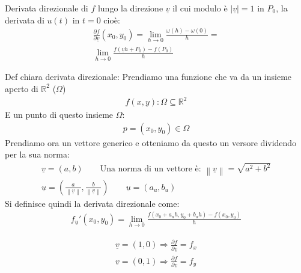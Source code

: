 \documentclass[a4paper, oneside]{article}
\begin{document}
        \begin{definition}
            Derivata direzionale di $f$ lungo la direzione $\underline{v}$ il cui modulo è $| \underline{v} | = 1$ in $P_0$, la derivata di $u(t)$ in $t=0$ cioè:
            \begin{gather*}
                \frac{\partial f}{\partial \underline{v}} (x_0,y_0) = \lim_{h \to 0} \frac{\omega(h) -\omega(0)}{h} = \\
                \lim_{h \to 0} \frac{f(\underline{v} h + P_0) - f(P_0)}{h}
            \end{gather*}
        \end{definition}
        \begin{definition}
            Def chiara derivata direzionale:
            Prendiamo una funzione che va da un insieme aperto di $\mathbb{R}^2$ ($\Omega$) 
            \begin{gather*}
                f(x,y):\Omega \subseteq \mathbb{R}^2
            \end{gather*}
            E un punto di questo insieme $\Omega$:
            \begin{gather*}
                p = (x_0,y_0) \in \Omega
            \end{gather*}
            Prendiamo ora un vettore generico e otteniamo da questo un versore dividendo per la sua norma:
            \begin{gather*}
                \underline{v}=(a,b) \qquad \text{Una norma di un vettore è: }\left\lVert \underline{v}\right\rVert = \sqrt{a^2+b^2}\\
                \underline{u} = (\frac{a}{\left\lVert \underline{v}\right\rVert },\frac{b}{\left\lVert \underline{v}\right\rVert }) \qquad \underline{u} = (a_u,b_u)
            \end{gather*}
            Si definisce quindi la derivata direzionale come:
            \begin{gather*}
                f_{\underline{u}}'(x_0,y_0) = \lim_{h \to 0} \frac{f(x_0+a_uh,y_0+b_uh)-f(x_0,y_0)}{h}
            \end{gather*}
        \end{definition}
        \begin{observation}
            \begin{gather*}
                \underline{v} = (1,0) \Rightarrow \frac{\partial f}{\partial \underline{v}} = f_x\\
                \underline{v} = (0,1) \Rightarrow \frac{\partial f}{\partial \underline{v}} = f_y\\
            \end{gather*}
        \end{observation}
\end{document}
